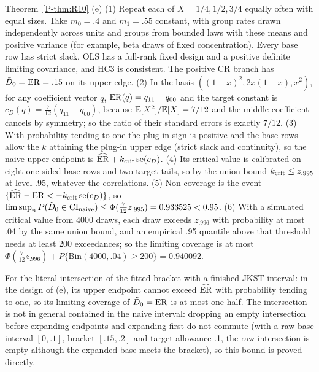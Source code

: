 \begin{proofof}{Theorem~\ref{P-thm:R10}}
(e) (1) Repeat each of $X=1/4,1/2,3/4$ equally often with equal sizes. Take $m_0=.4$
and $m_1=.55$ constant, with group rates drawn independently across units and groups
from bounded laws with these means and positive variance (for example, beta draws of
fixed concentration). Every base row has strict slack, OLS has a full-rank fixed design
and a positive definite limiting covariance, and HC3 is consistent. The positive CR
branch has $\tilde D_0=\mathrm{ER}=.15$ on its upper edge. (2) In the basis
$((1-x)^2,2x(1-x),x^2)$, for any coefficient vector $q$, $\mathrm{ER}(q)=q_{11}-q_{00}$ and the
target constant is $c_D(q)=\tfrac7{12}(q_{11}-q_{00})$, because $\mathbb E[X^2]/\mathbb E[X]=7/12$ and the
middle coefficient cancels by symmetry; so the ratio of their standard errors is
exactly $7/12$. (3) With probability tending to one the plug-in sign is positive and
the base rows allow the $k$ attaining the plug-in upper edge (strict slack and
continuity), so the naive upper endpoint is $\widehat{\mathrm{ER}}+k_{\rm crit}\operatorname{se}(c_D)$.
(4) Its critical value is calibrated on eight one-sided base rows and two target tails,
so by the union bound $k_{\rm crit}\le z_{.995}$ at level .95, whatever the correlations.
(5) Non-coverage is the event $\{\widehat{\mathrm{ER}}-\mathrm{ER}<-k_{\rm crit}\operatorname{se}(c_D)\}$, so
$\limsup_nP(\tilde D_0\in\mathrm{CI}_{\rm naive})\le\Phi(\tfrac7{12}z_{.995})=0.933525<0.95$.
(6) With a simulated critical value from 4000 draws, each draw exceeds $z_{.996}$ with
probability at most .04 by the same union bound, and an empirical .95 quantile above that
threshold needs at least 200 exceedances; so the limiting coverage is at most
$\Phi(\tfrac7{12}z_{.996})+P\{\mathrm{Bin}(4000,.04)\ge200\}=0.940092$.

For the literal intersection of the fitted bracket with a finished JKST interval: in the
design of (e), its upper endpoint cannot exceed $\widehat{\mathrm{ER}}$ with probability tending to
one, so its limiting coverage of $\tilde D_0=\mathrm{ER}$ is at most one half. The intersection
is not in general contained in the naive interval: dropping an empty intersection
before expanding endpoints and expanding first do not commute (with a raw base interval
$[0,.1]$, bracket $[.15,.2]$ and target allowance .1, the raw intersection is empty
although the expanded base meets the bracket), so this bound is proved directly.
\end{proofof}
